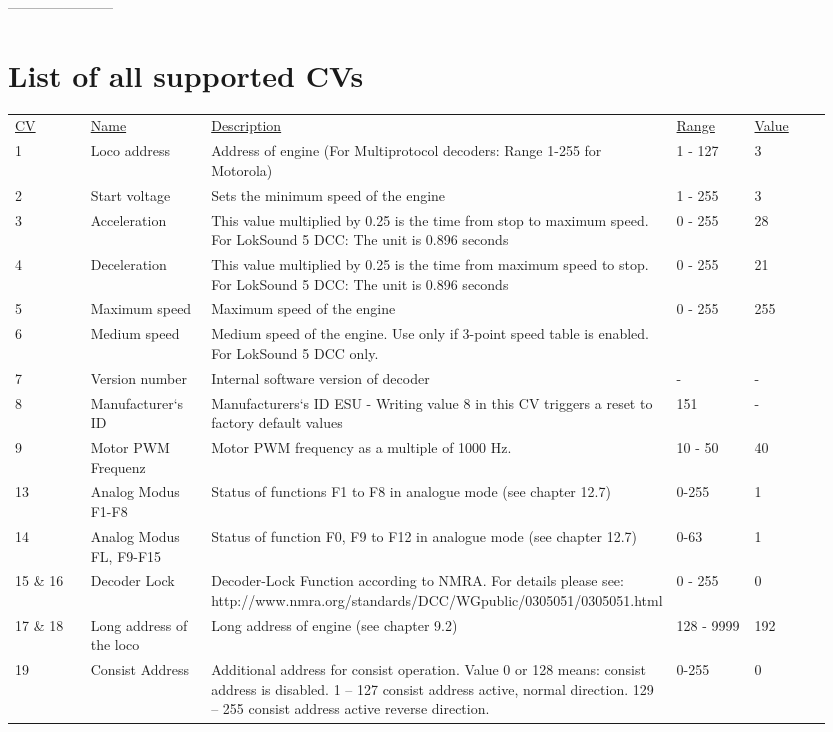 -----------------------

\section{List of all supported CVs}

\begin{tabular}{p{0.1\linewidth} p{0.15\linewidth} p{0.5\linewidth} p{0.1\linewidth} p{0.1\linewidth}} 
\underline{CV} & \underline{Name} &  \underline{Description} & \underline{Range} & \underline{Value}\\
1 & Loco address & Address of engine (For Multiprotocol decoders: Range 1-255 for Motorola) & 1 - 127  & 3\\
2 & Start voltage & Sets the minimum speed of the engine & 1 - 255  & 3\\
3 & Acceleration & This value multiplied by 0.25 is the time from stop to maximum speed. For LokSound 5 DCC: The unit is 0.896 seconds & 0 - 255 & 28\\
4 & Deceleration & This value multiplied by 0.25 is the time from maximum speed to stop. For LokSound 5 DCC: The unit is 0.896 seconds & 0 - 255 & 21\\
5 & Maximum speed & Maximum speed of the engine & 0 - 255 & 255\\
6 & Medium speed & Medium speed of the engine. Use only if 3-point speed table is enabled. For LokSound 5 DCC only.\\
7 & Version number & Internal software version of decoder & - & -\\
8 & Manufacturer‘s ID & Manufacturers‘s ID ESU - Writing value 8 in this CV triggers a reset to factory default values & 151 & -\\
9 & Motor PWM Frequenz & Motor PWM frequency as a multiple of 1000 Hz. & 10 - 50 & 40\\
13 & Analog Modus F1-F8 & Status of functions F1 to F8 in analogue mode (see chapter 12.7) & 0-255 & 1\\
14 & Analog Modus FL, F9-F15 & Status of function F0, F9 to F12 in analogue mode (see chapter 12.7) & 0-63 & 1\\
15 \& 16 & Decoder Lock & Decoder-Lock Function according to NMRA. For details please see: http://www.nmra.org/standards/DCC/WGpublic/0305051/0305051.html & 0 - 255 & 0\\
17 \& 18 & Long address of the loco & Long address of engine (see chapter 9.2) & 128 - 9999 & 192\\
19 & Consist Address & Additional address for consist operation. Value 0 or 128 means: consist address is disabled. 1 – 127 consist address active, normal direction. 129 – 255 consist address active reverse direction. & 0-255 & 0\\

\end{tabular}
